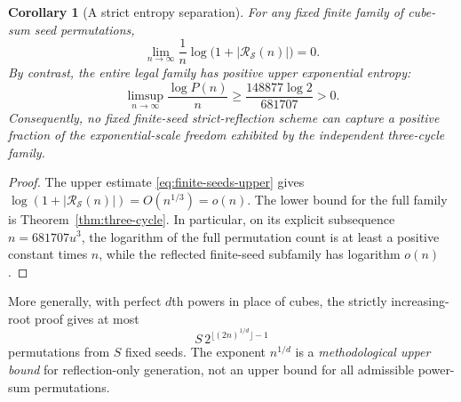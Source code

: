 \documentclass[10pt]{article}
\newtheorem{corollary}{Corollary}
\begin{document}
\begin{corollary}[A strict entropy separation]
\label{cor:entropy-separation}
For any fixed finite family of
cube-sum seed permutations,
\[
\lim_{n\to\infty}
\frac1n\log\bigl(
1+|\mathcal R_{\mathcal S}(n)|\bigr)=0.
\]
By contrast, the entire legal family
has positive upper exponential entropy:
\[
\boxed{\displaystyle
\limsup_{n\to\infty}
\frac{\log P(n)}n
\ge\frac{148877\log2}{681707}>0.}
\]
Consequently, no fixed finite-seed
strict-reflection scheme can capture a
positive fraction of the exponential-scale
freedom exhibited by the independent
three-cycle family.
\end{corollary}
\begin{proof}
The upper estimate
\eqref{eq:finite-seeds-upper} gives
$\log(1+|\mathcal R_{\mathcal S}(n)|)
=O(n^{1/3})=o(n)$.
The lower bound for the full family
is Theorem~\ref{thm:three-cycle}.
In particular, on its explicit
subsequence $n=681707u^3$,
the logarithm of the full permutation
count is at least a positive constant
times $n$, while the reflected
finite-seed subfamily has logarithm
$o(n)$.
\end{proof}

More generally, with perfect $d$th
powers in place of cubes, the strictly
increasing-root proof gives at most
\[
S\,2^{\lfloor(2n)^{1/d}\rfloor-1}
\]
permutations from $S$ fixed seeds.
The exponent $n^{1/d}$ is a
\emph{methodological upper bound}
for reflection-only generation, not
an upper bound for all admissible
power-sum permutations.
\end{document}
